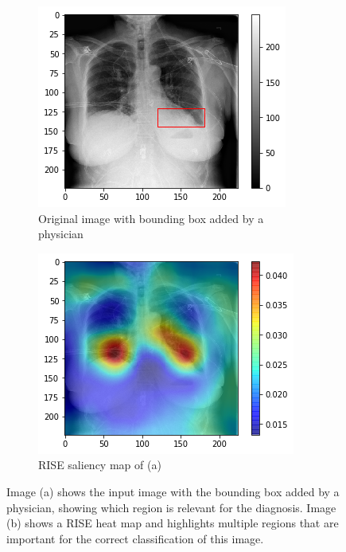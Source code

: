 \begin{figure}[H]
    \centering
    \begin{subfigure}[t]{.45\textwidth}
        \centering
        \includegraphics[width=\linewidth]{chapters/03_classification/images/rise1_bbox.png}
        \caption{Original image with bounding box added by a physician}
    \end{subfigure}\hspace{1cm}%
    \begin{subfigure}[t]{.45\textwidth}
        \centering
        \includegraphics[width=\linewidth]{chapters/03_classification/images/rise1_saliency.png}
        \caption{RISE saliency map of (a)}
    \end{subfigure}
    \caption{Image (a) shows the input image with the bounding box added by a physician, showing which region is relevant for the diagnosis. Image (b) shows a RISE heat map and highlights multiple regions that are important for the correct classification of this image.}
    \label{rise_example_2}
\end{figure}

